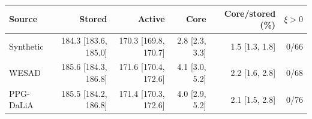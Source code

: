 \begin{tabular}{lrrrrr}
\toprule
Source & Stored & Active & Core & Core/stored (\%) & $\xi>0$ \\
\midrule
Synthetic & 184.3 [183.6, 185.0] & 170.3 [169.8, 170.7] & 2.8 [2.3, 3.3] & 1.5 [1.3, 1.8] & 0/66 \\
WESAD & 185.6 [184.3, 186.8] & 171.6 [170.4, 172.6] & 4.1 [3.0, 5.2] & 2.2 [1.6, 2.8] & 0/68 \\
PPG-DaLiA & 185.5 [184.2, 186.8] & 171.4 [170.3, 172.6] & 4.0 [2.9, 5.2] & 2.1 [1.5, 2.8] & 0/76 \\
\bottomrule
\end{tabular}
